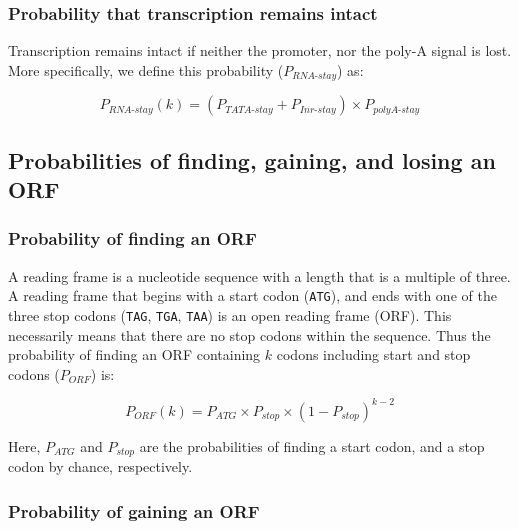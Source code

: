 \documentclass[12pt,a4paper]{article}
\begin{document}
\subsubsection{Probability that transcription remains intact}

Transcription remains intact if neither the promoter, nor the poly-A signal is lost. More specifically, we define this probability ($P_\textit{RNA-stay}$) as:

\begin{equation}
P_\textit{RNA-stay}(k) = (P_\textit{TATA-stay} + P_\textit{Inr-stay}) \times P_\textit{polyA-stay}
\label{eqrnastay}
\end{equation}

\subsection{Probabilities of finding, gaining, and losing an ORF}

\label{methORF}

\subsubsection{Probability of finding an ORF}

A reading frame is a nucleotide sequence with a length that is a multiple of three. A reading frame that begins with a start codon (\texttt{ATG}), and ends with one of the three stop codons (\texttt{TAG}, \texttt{TGA}, \texttt{TAA}) is an open reading frame (ORF). This necessarily means that there are no stop codons within the sequence. Thus the probability of finding an ORF containing $k$ codons including start and stop codons ($P_\textit{ORF}$) is: 

\begin{equation}
P_\textit{ORF}(k) = P_\textit{ATG} \times P_\textit{stop} \times (1 - P_\textit{stop})^{k-2}
\label{eqorfprob}
\end{equation}

Here, $P_\textit{ATG}$ and $P_\textit{stop}$ are the probabilities of finding a start codon, and a stop codon by chance, respectively.

\subsubsection{Probability of gaining an ORF}
\end{document}
